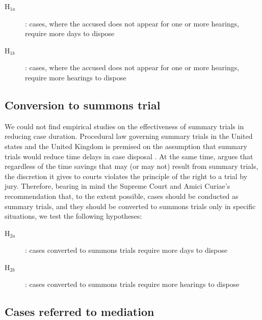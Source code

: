 \documentclass[12pt,a4paper]{article}
\begin{document}
		\begin{description}
			\item[H$_{1a}$]: cases, where the accused does not appear for one or more hearings, require more days to dispose
			\item[H$_{1b}$]: cases, where the accused does not appear for one or more hearings, require more hearings to dispose
		\end{description}
		
		\subsection{Conversion to summons trial}
		\label{sec:conv-summ-trial}
		
		We could not find empirical studies on the effectiveness of summary trials in reducing case duration. Procedural law governing summary trials in the United states and the United Kingdom is premised on the assumption that summary trials would reduce time delays in case disposal \autocite{miller2003}. At the same time, \textcite{miller2003} argues that regardless of the time savings that may (or may not) result from summary trials, the discretion it gives to courts violates the principle of the right to a trial by jury. Therefore, bearing in mind the Supreme Court and Amici Curiae's recommendation that, to the extent possible, cases should be conducted as summary trials, and they should be converted to summons trials only in specific situations, we test the following hypotheses:
		
		\begin{description}
			\item[H$_{2a}$]: cases converted to summons trials require more days to dispose
			\item[H$_{2b}$]: cases converted to summons trials require more hearings to dispose
		\end{description}
		
		\subsection{Cases referred to mediation} \label{sec:furth-exam-cases}
		
\end{document}
